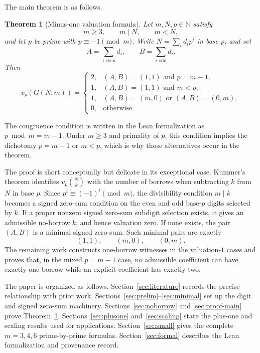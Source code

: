 \documentclass[11pt]{article}
\newtheorem{theorem}{Theorem}[section]
\newcommand{\G}{G}
\newcommand{\vp}{v_p}
\newcommand{\N}{\mathbb{N}}
\begin{document}
The main theorem is as follows.

\begin{theorem}[Minus-one valuation formula]\label{thm:minus-one}
Let $m,N,p\in\N$ satisfy
\[
  m\geq 3,\qquad m\mid N,
  \qquad m<N,
\]
and let $p$ be prime with $p\equiv -1\pmod m$.  Write
$N=\sum_i d_i p^i$ in base $p$, and set
\[
  A=\sum_{i\text{ even}}d_i,
  \qquad
  B=\sum_{i\text{ odd}}d_i .
\]
Then
\[
\vp(\G(N;m))=
\begin{cases}
2,& (A,B)=(1,1)\text{ and }p=m-1,\\
1,& (A,B)=(1,1)\text{ and }m<p,\\
1,& (A,B)=(m,0)\text{ or }(A,B)=(0,m),\\
0,& \text{otherwise.}
\end{cases}
\]
\end{theorem}

The congruence condition is written in the Lean formalization as
$p\bmod m=m-1$.  Under $m\geq 3$ and primality of $p$, this condition implies the
dichotomy $p=m-1$ or $m<p$, which is why those alternatives occur in the theorem.

The proof is short conceptually but delicate in its exceptional case.  Kummer's
theorem identifies $\vp\binom Nk$ with the number of borrows when subtracting
$k$ from $N$ in base $p$.  Since $p^i\equiv (-1)^i\pmod m$, the divisibility
condition $m\mid k$ becomes a signed zero-sum condition on the even and odd
base-$p$ digits selected by $k$.  If a proper nonzero signed zero-sum subdigit
selection exists, it gives an admissible no-borrow $k$, and hence valuation
zero.  If none exists, the pair $(A,B)$ is a minimal signed zero-sum.  Such
minimal pairs are exactly
\[
  (1,1),\qquad (m,0),\qquad (0,m).
\]
The remaining work constructs one-borrow witnesses in the valuation-$1$ cases
and proves that, in the mixed $p=m-1$ case, no admissible coefficient can have
exactly one borrow while an explicit coefficient has exactly two.

The paper is organized as follows.  Section~\ref{sec:literature} records the
precise relationship with prior work.  Sections~\ref{sec:prelim}--\ref{sec:minimal}
set up the digit and signed zero-sum machinery.  Sections~\ref{sec:noborrow} and
\ref{sec:proof-main} prove Theorem~\ref{thm:minus-one}.  Sections~\ref{sec:plusone}
and~\ref{sec:scaling} state the plus-one and scaling results used for applications.
Section~\ref{sec:small} gives the complete $m=3,4,6$ prime-by-prime formulas.
Section~\ref{sec:formal} describes the Lean formalization and provenance record.
\end{document}
